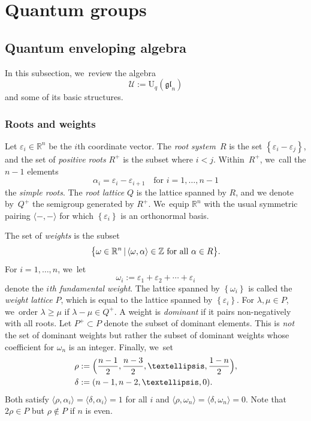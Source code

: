 \documentclass[11pt]{article}
\let\epsilon\varepsilon
\newcommand{\rU}{\mathrm{U}}
\theoremstyle{definition}
\newcommand{\RR}{\mathbb{R}}
\newcommand{\ZZ}{\mathbb{Z}}
\newcommand{\gl}{\mathfrak{gl}}
\begin{document}
\section{Quantum groups}

\subsection{Quantum enveloping algebra}
In this subsection, we~review the algebra
\[
\mathcal{U}:=\rU_q(\gl_n)
\]
and some of its basic structures.

\subsubsection{Roots and weights}
Let $\epsilon_i\in \RR^n$ be the $i$th coordinate vector.
The \textit{root system}~$R$ is the set $\left\{ \epsilon_i-\epsilon_j \right\}$, and the set of \textit{positive roots} $R^+$ is the subset where $i<j$.
Within~$R^+$, we~call the $n-1$ elements
\[
\alpha_i=\epsilon_i-\epsilon_{i+1}\quad\text{for }i=1,\ldots, n-1
\]
the \textit{simple roots}.
The \textit{root lattice} $Q$ is the lattice spanned by $R$, and we denote by~$Q^+$ the semigroup generated by $R^+$. We~equip $\RR^n$ with the usual symmetric pairing $\langle-,-\rangle$ for which $\left\{ \epsilon_i \right\}$ is an orthonormal basis.

The set of \textit{weights} is the subset
\[
\bigl\{ \omega\in\RR^n\, |\, \langle\omega,\alpha\rangle\in\ZZ\hbox{ for all }\alpha\in R \bigr\}.
\]
For $i=1,\ldots, n$, we~let
\[
\omega_i:=\epsilon_1+\epsilon_2+\cdots+\epsilon_i
\]
denote the \textit{$i$th fundamental weight}.
The lattice spanned by $\left\{ \omega_i \right\}$ is called the \textit{weight lattice} $P$, which is equal to the lattice spanned by $\left\{ \epsilon_i \right\}$.
For $\lambda, \mu\in P$, we~order $\lambda\ge\mu$ if $\lambda-\mu\in Q^+$.
A weight is \textit{dominant} if it pairs non-negatively with all roots.
Let $P^+\subset P$ denote the subset of dominant elements.
This is \textit{not} the set of dominant weights but rather the subset of dominant weights whose coefficient for $\omega_n$ is an integer.
Finally, we~set
\begin{align*}
\rho&:=\Bigl(\frac{n-1}{2}, \frac{n-3}{2},\ldots,\frac{1-n}{2} \Bigr),\\
\delta&:=(n-1, n-2,\ldots, 0).
\end{align*}
Both satisfy $\langle\rho, \alpha_i\rangle =\langle\delta,\alpha_i\rangle=1$ for all $i$ and $\langle\rho,\omega_n\rangle=\langle \delta,\omega_n\rangle=0$.
Note that $2\rho\in P$ but $\rho\not\in P$ if $n$ is even.
\end{document}
